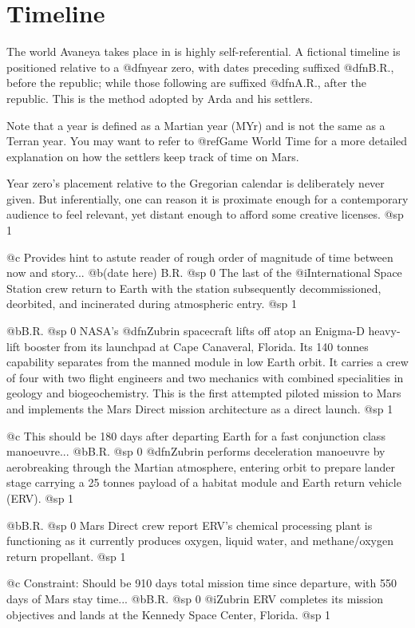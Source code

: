 \chapter{Timeline}

The world Avaneya takes place in is highly self-referential. A fictional timeline is positioned relative to a @dfn{year zero}, with dates preceding suffixed @dfn{B.R.}, before the republic; while those following are suffixed @dfn{A.R.}, after the republic. This is the method adopted by Arda and his settlers. 

Note that a year is defined as a Martian year (MYr) and is not the same as a Terran year. You may want to refer to @ref{Game World Time} for a more detailed explanation on how the settlers keep track of time on Mars.

Year zero's placement relative to the Gregorian calendar is deliberately never given. But inferentially, one can reason it is proximate enough for a contemporary audience to feel relevant, yet distant enough to afford some creative licenses.
@sp 1

@c Provides hint to astute reader of rough order of magnitude of time between now and story...
@b{(date here) B.R.}
@sp 0
The last of the @i{International Space Station} crew return to Earth with the station subsequently decommissioned, deorbited, and incinerated during atmospheric entry.
@sp 1

@b{B.R.}
@sp 0
NASA's @dfn{Zubrin} spacecraft lifts off atop an Enigma-D heavy-lift booster from its launchpad at Cape Canaveral, Florida. Its 140 tonnes capability separates from the manned module in low Earth orbit. It carries a crew of four with two flight engineers and two mechanics with combined specialities in geology and biogeochemistry. This is the first attempted piloted mission to Mars and implements the Mars Direct mission architecture as a direct launch.
@sp 1

@c This should be 180 days after departing Earth for a fast conjunction class manoeuvre...
@b{B.R.}
@sp 0
@dfn{Zubrin} performs deceleration manoeuvre by aerobreaking through the Martian atmosphere, entering orbit to prepare lander stage carrying a 25 tonnes payload of a habitat module and Earth return vehicle (ERV).
@sp 1

@b{B.R.}
@sp 0
Mars Direct crew report ERV's chemical processing plant is functioning as it currently produces oxygen, liquid water, and methane/oxygen return propellant.
@sp 1

@c Constraint: Should be 910 days total mission time since departure, with 550 days of Mars stay time...
@b{B.R.}
@sp 0
@i{Zubrin ERV} completes its mission objectives and lands at the Kennedy Space Center, Florida.
@sp 1

